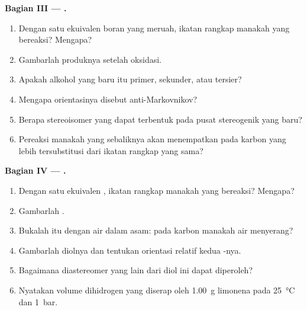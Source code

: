 \begin{problem}
\medskip
\noindent\textbf{Bagian III --- .}
\begin{enumerate}[resume]
  \item Dengan satu ekuivalen boran yang meruah, ikatan rangkap manakah yang
        bereaksi? Mengapa?
  \item Gambarlah produknya setelah oksidasi.
  \item Apakah alkohol yang baru itu primer, sekunder, atau tersier?
  \item Mengapa orientasinya disebut anti-Markovnikov?
  \item Berapa stereoisomer yang dapat terbentuk pada pusat stereogenik yang baru?
  \item Pereaksi manakah yang sebaliknya akan menempatkan  pada karbon
        yang lebih tersubstitusi dari ikatan rangkap yang
        sama?
\end{enumerate}

\medskip
\noindent\textbf{Bagian IV --- .}
\begin{enumerate}[resume]
  \item Dengan satu ekuivalen , ikatan rangkap manakah yang
        bereaksi? Mengapa?
  \item Gambarlah .
  \item Bukalah  itu dengan air dalam asam: pada karbon manakah air menyerang?
  \item Gambarlah diolnya dan tentukan orientasi relatif kedua -nya.
  \item Bagaimana diastereomer yang lain dari diol ini dapat diperoleh?
  \item Nyatakan volume dihidrogen yang diserap oleh \qty{1.00}{g} limonena pada
        \qty{25}{\degreeCelsius} dan \qty{1}{bar}.
\end{enumerate}
\end{problem}
